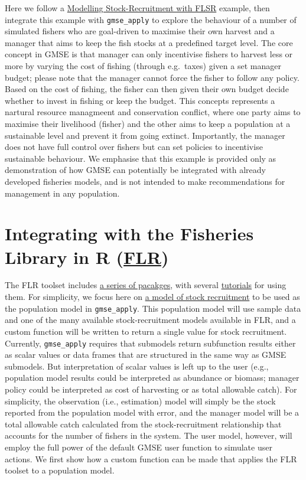 \documentclass[]{article}
\begin{document}
Here we follow a
\href{http://www.flr-project.org/doc/Modelling_stock_recruitment_with_FLSR.html}{Modelling
Stock-Recruitment with FLSR} example, then integrate this example with
\texttt{gmse\_apply} to explore the behaviour of a number of simulated
fishers who are goal-driven to maximise their own harvest and a manager
that aims to keep the fish stocks at a predefined target level. The core
concept in GMSE is that manager can only incentivise fishers to harvest
less or more by varying the cost of fishing (through e.g.~taxes) given a
set manager budget; please note that the manager cannot force the fisher
to follow any policy. Based on the cost of fishing, the fisher can then
given their own budget decide whether to invest in fishing or keep the
budget. This concepts represents a nartural resource managmeent and
conservation conflict, where one party aims to maximise their livelihood
(fisher) and the other aims to keep a population at a sustainable level
and prevent it from going extinct. Importantly, the manager does not
have full control over fishers but can set policies to incentivise
sustainable behaviour. We emphasise that this example is provided only
as demonstration of how GMSE can potentially be integrated with already
developed fisheries models, and is not intended to make recommendations
for management in any population.

\section{\texorpdfstring{Integrating with the Fisheries Library in R
(\href{http://www.flr-project.org/}{FLR})}{Integrating with the Fisheries Library in R (FLR)}}\label{integrating-with-the-fisheries-library-in-r-flr}

The FLR toolset includes \href{http://www.flr-project.org/\#packages}{a
series of pacakges}, with several
\href{http://www.flr-project.org/doc/index.html}{tutorials} for using
them. For simplicity, we focus here on
\href{http://www.flr-project.org/doc/Modelling_stock_recruitment_with_FLSR.html}{a
model of stock recruitment} to be used as the population model in
\texttt{gmse\_apply}. This population model will use sample data and one
of the many available stock-recruitment models available in FLR, and a
custom function will be written to return a single value for stock
recruitment. Currently, \texttt{gmse\_apply} requires that submodels
return subfunction results either as scalar values or data frames that
are structured in the same way as GMSE submodels. But interpretation of
scalar values is left up to the user (e.g., population model results
could be interpreted as abundance or biomass; manager policy could be
interpreted as cost of harvesting or as total allowable catch). For
simplicity, the observation (i.e., estimation) model will simply be the
stock reported from the population model with error, and the manager
model will be a total allowable catch calculated from the
stock-recruitment relationship that accounts for the number of fishers
in the system. The user model, however, will employ the full power of
the default GMSE user function to simulate user actions. We first show
how a custom function can be made that applies the FLR toolset to a
population model.
\end{document}
